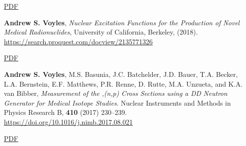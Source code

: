 \begin{bibsection}
\ifshort \vspace{0.1cm} \href{https://avoyles.github.io/papers/Voyles2018_Nb_px.pdf}{\underline{PDF}} \else  \fi


\item \textbf{Andrew S. Voyles}, \emph{Nuclear Excitation Functions for the Production of Novel Medical Radionuclides}, University of California, Berkeley, (2018). \url{https://search.proquest.com/docview/2135771326}


\ifshort \vspace{0.1cm} \href{https://avoyles.github.io/papers/ASV_Dissertation.pdf}{\underline{PDF}} \else  \fi 



    



\item \textbf{Andrew S. Voyles}, M.S. Basunia, J.C. Batchelder, J.D. Bauer, T.A. Becker, L.A. Bernstein, E.F. Matthews, P.R. Renne, D. Rutte, M.A. Unzueta, and K.A. van Bibber, \emph{Measurement of the ,(n,p) Cross Sections using a DD Neutron Generator for Medical Isotope Studies}. Nuclear Instruments and Methods in Physics Research  B, \textbf{410} (2017) 230--239. \url{https://doi.org/10.1016/j.nimb.2017.08.021}

\ifshort \vspace{0.1cm} \href{https://avoyles.github.io/papers/Voyles2017_HFNG.pdf}{\underline{PDF}} \else  \fi 











\end{bibsection}
